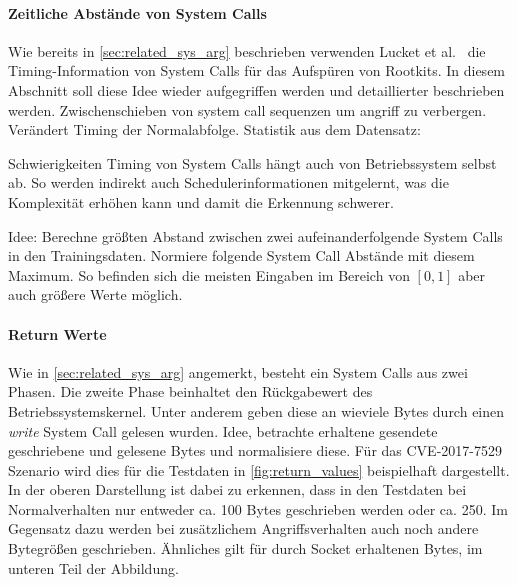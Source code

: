             \paragraph{Zeitliche Abstände von System Calls}

                Wie bereits in \autoref{sec:related_sys_arg} beschrieben verwenden Lucket et al.~\cite{TIMINGLUCKETT2016} die Timing-Information von System Calls für das Aufspüren von Rootkits.
                In diesem Abschnitt soll diese Idee wieder aufgegriffen werden und detaillierter beschrieben werden.
                Zwischenschieben von system call sequenzen um angriff zu verbergen.
                Verändert Timing der Normalabfolge.
                Statistik aus dem Datensatz:

                Schwierigkeiten Timing von System Calls hängt auch von Betriebssystem selbst ab.
                So werden indirekt auch Schedulerinformationen mitgelernt, was die Komplexität erhöhen kann und damit die Erkennung schwerer.
                
                Idee:
                Berechne größten Abstand zwischen zwei aufeinanderfolgende System Calls in den Trainingsdaten.
                Normiere folgende System Call Abstände mit diesem Maximum.
                So befinden sich die meisten Eingaben im Bereich von $[0,1]$ aber auch größere Werte möglich.

            \paragraph{Return Werte}

                Wie in \autoref{sec:related_sys_arg} angemerkt, besteht ein System Calls aus zwei \glqq Phasen\grqq .
                Die zweite Phase beinhaltet den Rückgabewert des Betriebssystemskernel.
                Unter anderem geben diese an wieviele Bytes durch einen \textit{write} System Call gelesen wurden.
                Idee, betrachte erhaltene gesendete geschriebene und gelesene Bytes und normalisiere diese.
                Für das CVE-2017-7529 Szenario wird dies für die Testdaten in \autoref{fig:return_values} beispielhaft dargestellt.
                In der oberen Darstellung ist dabei zu erkennen, dass in den Testdaten bei Normalverhalten nur entweder ca. 100 Bytes geschrieben werden oder ca. 250.
                Im Gegensatz dazu werden bei zusätzlichem Angriffsverhalten auch noch andere Bytegrößen geschrieben.
                Ähnliches gilt für durch Socket erhaltenen Bytes, im unteren Teil der Abbildung.
                
